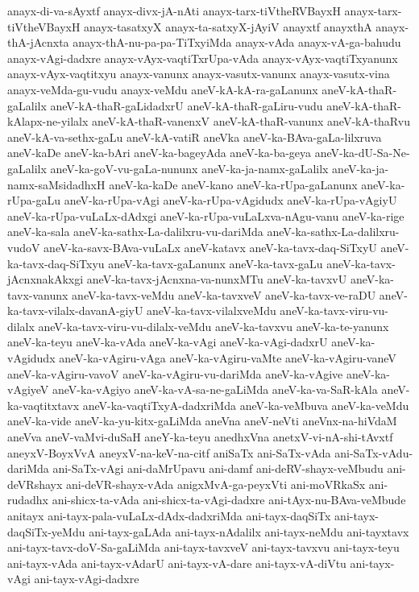 {anayx-di-va-sAyxtf
anayx-divx-jA-nAti
anayx-tarx-tiVtheRVBayxH
anayx-tarx-tiVtheVBayxH
anayx-tasatxyX
anayx-ta-satxyX-jAyiV
anayxtf
anayxthA
anayx-thA-jAcnxta
anayx-thA-nu-pa-pa-TiTxyiMda
anayx-vAda
anayx-vA-ga-bahudu
anayx-vAgi-dadxre
anayx-vAyx-vaqtiTxrUpa-vAda
anayx-vAyx-vaqtiTxyanunx
anayx-vAyx-vaqtitxyu
anayx-vanunx
anayx-vasutx-vanunx
anayx-vasutx-vina
anayx-veMda-gu-vudu
anayx-veMdu
aneV-kA-kA-ra-gaLanunx
aneV-kA-thaR-gaLalilx
aneV-kA-thaR-gaLidadxrU
aneV-kA-thaR-gaLiru-vudu
aneV-kA-thaR-kAlapx-ne-yilalx
aneV-kA-thaR-vanenxV
aneV-kA-thaR-vanunx
aneV-kA-thaRvu
aneV-kA-va-sethx-gaLu
aneV-kA-vatiR
aneVka
aneV-ka-BAva-gaLa-lilxruva
aneV-kaDe
aneV-ka-bAri
aneV-ka-bageyAda
aneV-ka-ba-geya
aneV-ka-dU-Sa-Ne-gaLalilx
aneV-ka-goV-vu-gaLa-nununx
aneV-ka-ja-namx-gaLalilx
aneV-ka-ja-namx-saMsidadhxH
aneV-ka-kaDe
aneV-kano
aneV-ka-rUpa-gaLanunx
aneV-ka-rUpa-gaLu
aneV-ka-rUpa-vAgi
aneV-ka-rUpa-vAgidudx
aneV-ka-rUpa-vAgiyU
aneV-ka-rUpa-vuLaLx-dAdxgi
aneV-ka-rUpa-vuLaLxva-nAgu-vanu
aneV-ka-rige
aneV-ka-sala
aneV-ka-sathx-La-dalilxru-vu-dariMda
aneV-ka-sathx-La-dalilxru-vudoV
aneV-ka-savx-BAva-vuLaLx
aneV-katavx
aneV-ka-tavx-daq-SiTxyU
aneV-ka-tavx-daq-SiTxyu
aneV-ka-tavx-gaLanunx
aneV-ka-tavx-gaLu
aneV-ka-tavx-jAcnxnakAkxgi
aneV-ka-tavx-jAcnxna-va-nunxMTu
aneV-ka-tavxvU
aneV-ka-tavx-vanunx
aneV-ka-tavx-veMdu
aneV-ka-tavxveV
aneV-ka-tavx-ve-raDU
aneV-ka-tavx-vilalx-davanA-giyU
aneV-ka-tavx-vilalxveMdu
aneV-ka-tavx-viru-vu-dilalx
aneV-ka-tavx-viru-vu-dilalx-veMdu
aneV-ka-tavxvu
aneV-ka-te-yanunx
aneV-ka-teyu
aneV-ka-vAda
aneV-ka-vAgi
aneV-ka-vAgi-dadxrU
aneV-ka-vAgidudx
aneV-ka-vAgiru-vAga
aneV-ka-vAgiru-vaMte
aneV-ka-vAgiru-vaneV
aneV-ka-vAgiru-vavoV
aneV-ka-vAgiru-vu-dariMda
aneV-ka-vAgive
aneV-ka-vAgiyeV
aneV-ka-vAgiyo
aneV-ka-vA-sa-ne-gaLiMda
aneV-ka-va-SaR-kAla
aneV-ka-vaqtitxtavx
aneV-ka-vaqtiTxyA-dadxriMda
aneV-ka-veMbuva
aneV-ka-veMdu
aneV-ka-vide
aneV-ka-yu-kitx-gaLiMda
aneVna
aneV-neVti
aneVnx-na-hiVdaM
aneVva
aneV-vaMvi-duSaH
aneY-ka-teyu
anedhxVna
anetxV-vi-nA-shi-tAvxtf
aneyxV-BoyxVvA
aneyxV-na-keV-na-citf
aniSaTx
ani-SaTx-vAda
ani-SaTx-vAdu-dariMda
ani-SaTx-vAgi
ani-daMrUpavu
ani-damf
ani-deRV-shayx-veMbudu
ani-deVRshayx
ani-deVR-shayx-vAda
anigxMvA-ga-peyxVti
ani-moVRkaSx
ani-rudadhx
ani-shicx-ta-vAda
ani-shicx-ta-vAgi-dadxre
ani-tAyx-nu-BAva-veMbude
anitayx
ani-tayx-pala-vuLaLx-dAdx-dadxriMda
ani-tayx-daqSiTx
ani-tayx-daqSiTx-yeMdu
ani-tayx-gaLAda
ani-tayx-nAdalilx
ani-tayx-neMdu
ani-tayxtavx
ani-tayx-tavx-doV-Sa-gaLiMda
ani-tayx-tavxveV
ani-tayx-tavxvu
ani-tayx-teyu
ani-tayx-vAda
ani-tayx-vAdarU
ani-tayx-vA-dare
ani-tayx-vA-diVtu
ani-tayx-vAgi
ani-tayx-vAgi-dadxre
}
